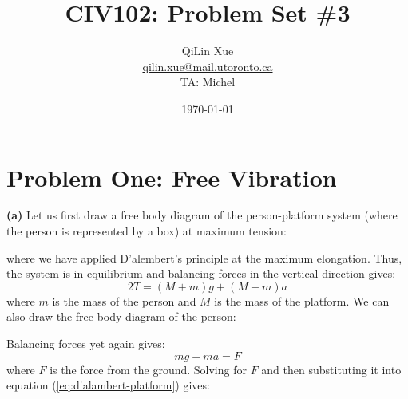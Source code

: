 \documentclass{article}
\title{CIV102: Problem Set \#3}
\author{QiLin Xue \\ \href{mailto:qilin.xue@mail.utoronto.ca}{qilin.xue@mail.utoronto.ca} \\ TA: Michel}
\date{\today}
\begin{document}
\maketitle
\section{Problem One: Free Vibration}
\textbf{(a)} Let us first draw a free body diagram of the person-platform system (where the person is represented by a box) at maximum tension:
\begin{center}
\end{center}
where we have applied D'alembert's principle at the maximum elongation. Thus, the system is in equilibrium and balancing forces in the vertical direction gives:
\begin{equation}
    2T=(M+m)g+(M+m)a
    \label{eq:d'alambert-platform}
\end{equation}
where $m$ is the mass of the person and $M$ is the mass of the platform. We can also draw the free body diagram of the person:
\begin{center}
\end{center}
Balancing forces yet again gives:
\begin{equation}
    mg+ma=F
    \label{eq:d'alambert block}
\end{equation}
where $F$ is the force from the ground. Solving for $F$ and then substituting it into equation (\ref{eq:d'alambert-platform}) gives:
\end{document}
